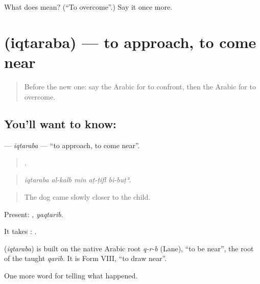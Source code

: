 \begin{tcolorbox}[breakable,colback=teal!4,colframe=teal!35!black,title={Before you move on}]
What does  mean? (\textquotedblleft{}To overcome\textquotedblright{}.) Say it once more.
\end{tcolorbox}
\section[\texorpdfstring{\ar{اقترب} (iqtaraba)}{اقترب (iqtaraba)}]{ (iqtaraba) — to approach, to come near}

\label{lesson:AR-C345-iqtaraba}



\begin{quote}
Before the new one: say the Arabic for to confront, then the Arabic for to overcome.
\end{quote}

\subsection*{You'll want to know: }
\textbf{} — \emph{iqtaraba} — \textquotedblleft{}to approach, to come near\textquotedblright{}.

\begin{quote}
    .
\end{quote}

\begin{quote}
\emph{iqtaraba al-kalb min aṭ-ṭifl bi-buṭʾ.}
\end{quote}

\begin{quote}
The dog came slowly closer to the child.
\end{quote}

Present: , \emph{yaqtarib}.

It takes :  .

\begin{cousinweb}
\textbf{} (\emph{iqtaraba}) is built on the native Arabic root \emph{q-r-b} (Lane), \textquotedblleft{}to be near\textquotedblright{}, the root of the taught \emph{qarīb}. It is Form VIII, \textquotedblleft{}to draw near\textquotedblright{}.
\end{cousinweb}

\begin{grammarlens}[title={What you've built}]
One more word for telling what happened.
\end{grammarlens}

